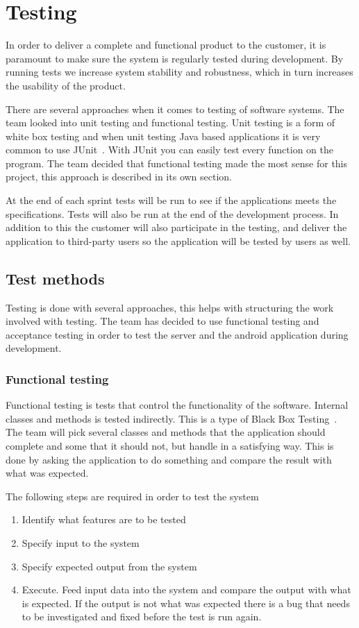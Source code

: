 \chapter{Testing}

In order to deliver a complete and functional product to the customer, it is paramount to make sure the system is regularly tested during development. By running tests we increase system stability and robustness, which in turn increases the usability of the product. 

There are several approaches when it comes to testing of software systems. The team looked into unit testing and functional testing. Unit testing is a form of white box testing and when unit testing Java based applications it is very common to use JUnit~\cite{junit}. With JUnit you can easily test every function on the program. The team decided that functional testing made the most sense for this project, this approach is described in its own section.

At the end of each sprint tests will be run to see if the applications meets the specifications. Tests will also be run at the end of the development process. In addition to this the customer will also participate in the testing, and deliver the application to third-party users so the application will be tested by users as well.

\section{Test methods}
Testing is done with several approaches, this helps with structuring the work involved with testing. The team has decided to use functional testing and acceptance testing in order to test the server and the android application during development.

\subsection{Functional testing}
Functional testing is tests that control the functionality of the software. Internal classes and methods is tested indirectly. This is a type of Black Box Testing~\cite{blackbox}. The team will pick several classes and methods that the application should complete and some that it should not, but handle in a satisfying way. This is done by asking the application to do something and compare the result with what was expected.

The following steps are required in order to test the system
\begin{enumerate}
\item Identify what features are to be tested
\item Specify input to the system
\item Specify expected output from the system
\item Execute. Feed input data into the system and compare the output with what is expected. If the output is not what was expected there is a bug that needs to be investigated and fixed before the test is run again.
\end{enumerate}

